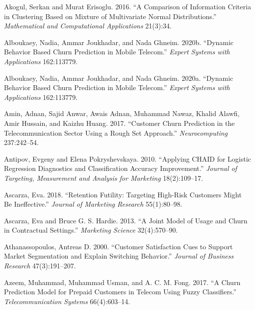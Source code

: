 \documentclass[
  12pt,
]{article}
\newlength{\cslhangindent}
\newlength{\cslentryspacingunit} %
\newenvironment{CSLReferences}[2] %
 {%
  \setlength{\parindent}{0pt}
  \ifodd #1
  \let\oldpar\par
  \def\par{\hangindent=\cslhangindent\oldpar}
  \fi
  \setlength{\parskip}{#2\cslentryspacingunit}
 }%
 {}
\begin{document}
\hypertarget{refs}{}
\begin{CSLReferences}{1}{0}
\leavevmode{}%
Akogul, Serkan and Murat Erisoglu. 2016. {``A Comparison of Information Criteria in Clustering Based on Mixture of Multivariate Normal Distributions.''} \emph{Mathematical and Computational Applications} 21(3):34.

\leavevmode{}%
Alboukaey, Nadia, Ammar Joukhadar, and Nada Ghneim. 2020b. {``Dynamic Behavior Based Churn Prediction in Mobile Telecom.''} \emph{Expert Systems with Applications} 162:113779.

\leavevmode{}%
Alboukaey, Nadia, Ammar Joukhadar, and Nada Ghneim. 2020a. {``Dynamic Behavior Based Churn Prediction in Mobile Telecom.''} \emph{Expert Systems with Applications} 162:113779.

\leavevmode{}%
Amin, Adnan, Sajid Anwar, Awais Adnan, Muhammad Nawaz, Khalid Alawfi, Amir Hussain, and Kaizhu Huang. 2017. {``Customer Churn Prediction in the Telecommunication Sector Using a Rough Set Approach.''} \emph{Neurocomputing} 237:242--54.

\leavevmode{}%
Antipov, Evgeny and Elena Pokryshevskaya. 2010. {``Applying {CHAID} for Logistic Regression Diagnostics and Classification Accuracy Improvement.''} \emph{Journal of Targeting, Measurement and Analysis for Marketing} 18(2):109--17.

\leavevmode{}%
Ascarza, Eva. 2018. {``Retention Futility: Targeting High-Risk Customers Might Be Ineffective.''} \emph{Journal of Marketing Research} 55(1):80--98.

\leavevmode{}%
Ascarza, Eva and Bruce G. S. Hardie. 2013. {``A Joint Model of Usage and Churn in Contractual Settings.''} \emph{Marketing Science} 32(4):570--90.

\leavevmode{}%
Athanassopoulos, Antreas D. 2000. {``Customer Satisfaction Cues to Support Market Segmentation and Explain Switching Behavior.''} \emph{Journal of Business Research} 47(3):191--207.

\leavevmode{}%
Azeem, Muhammad, Muhammad Usman, and A. C. M. Fong. 2017. {``A Churn Prediction Model for Prepaid Customers in Telecom Using Fuzzy Classifiers.''} \emph{Telecommunication Systems} 66(4):603--14.


\end{CSLReferences}
\end{document}
